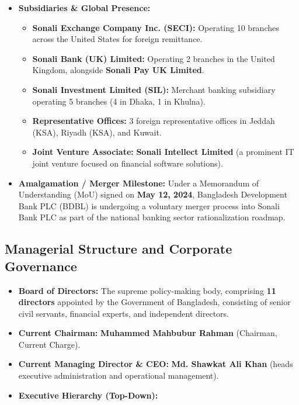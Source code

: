 \begin{itemize}
  \item \textbf{Subsidiaries \& Global Presence:}
  \begin{itemize}
    \item \textbf{Sonali Exchange Company Inc. (SECI):} Operating 10 branches across the United States for foreign remittance.
    \item \textbf{Sonali Bank (UK) Limited:} Operating 2 branches in the United Kingdom, alongside \textbf{Sonali Pay UK Limited}.
    \item \textbf{Sonali Investment Limited (SIL):} Merchant banking subsidiary operating 5 branches (4 in Dhaka, 1 in Khulna).
    \item \textbf{Representative Offices:} 3 foreign representative offices in Jeddah (KSA), Riyadh (KSA), and Kuwait.
    \item \textbf{Joint Venture Associate:} \textbf{Sonali Intellect Limited} (a prominent IT joint venture focused on financial software solutions).
  \end{itemize}
  \item \textbf{Amalgamation / Merger Milestone:} Under a Memorandum of Understanding (MoU) signed on \textbf{May 12, 2024}, Bangladesh Development Bank PLC (BDBL) is undergoing a voluntary merger process into Sonali Bank PLC as part of the national banking sector rationalization roadmap.
\end{itemize}

\medskip

\subsection{Managerial Structure and Corporate Governance}

\begin{itemize}
  \item \textbf{Board of Directors:} The supreme policy-making body, comprising \textbf{11 directors} appointed by the Government of Bangladesh, consisting of senior civil servants, financial experts, and independent directors.
  \item \textbf{Current Chairman:} \textbf{Muhammed Mahbubur Rahman} (Chairman, Current Charge).
  \item \textbf{Current Managing Director \& CEO:} \textbf{Md. Shawkat Ali Khan} (heads executive administration and operational management).
  \item \textbf{Executive Hierarchy (Top-Down):}
\end{itemize}

